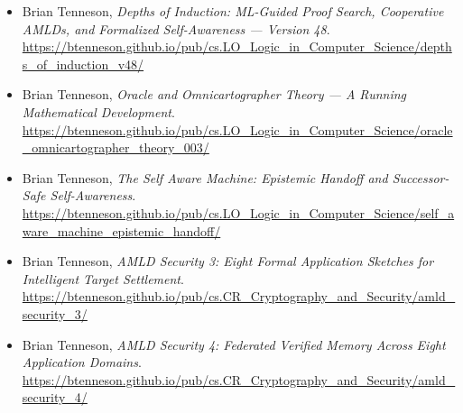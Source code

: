 \documentclass[11pt]{article}
\theoremstyle{definition}
\begin{document}
\begin{itemize}[leftmargin=*]
\item Brian Tenneson, \emph{Depths of Induction: ML-Guided Proof Search, Cooperative AMLDs, and Formalized Self-Awareness --- Version 48}.\\
\url{https://btenneson.github.io/pub/cs.LO_Logic_in_Computer_Science/depths_of_induction_v48/}

\item Brian Tenneson, \emph{Oracle and Omnicartographer Theory --- A Running Mathematical Development}.\\
\url{https://btenneson.github.io/pub/cs.LO_Logic_in_Computer_Science/oracle_omnicartographer_theory_003/}

\item Brian Tenneson, \emph{The Self Aware Machine: Epistemic Handoff and Successor-Safe Self-Awareness}.\\
\url{https://btenneson.github.io/pub/cs.LO_Logic_in_Computer_Science/self_aware_machine_epistemic_handoff/}

\item Brian Tenneson, \emph{AMLD Security 3: Eight Formal Application Sketches for Intelligent Target Settlement}.\\
\url{https://btenneson.github.io/pub/cs.CR_Cryptography_and_Security/amld_security_3/}

\item Brian Tenneson, \emph{AMLD Security 4: Federated Verified Memory Across Eight Application Domains}.\\
\url{https://btenneson.github.io/pub/cs.CR_Cryptography_and_Security/amld_security_4/}
\end{itemize}
\end{document}
